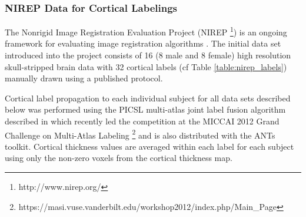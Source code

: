 %
%

\subsubsection{NIREP Data for Cortical Labelings}

The Nonrigid Image Registration Evaluation Project (NIREP%
\footnote{
http://www.nirep.org/
}) 
is an ongoing framework for evaluating image registration algorithms \citep{christensen2006}.
The initial data set introduced into the project consists of 
16 (8 male and 8 female) high resolution skull-stripped brain 
data with 32 cortical labels (cf Table \ref{table:nirep_labels}) manually drawn using a 
published protocol.

Cortical label propagation to each individual subject for all data sets
described below was performed using the PICSL multi-atlas joint label fusion
algorithm described in \cite{wang2013} which recently led the competition
at the MICCAI 2012 Grand Challenge on Multi-Atlas Labeling%
\footnote{
https://masi.vuse.vanderbilt.edu/workshop2012/index.php/Main\_Page
}
and is also 
distributed with the ANTs toolkit.  Cortical thickness values are averaged
within each label for each subject using only the non-zero voxels from the cortical thickness map.

